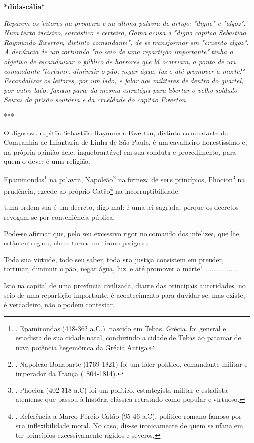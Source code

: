 \textbf{*didascália*}

\emph{Reparem os leitores na primeira e na última palavra do artigo:
"digno" e "algoz". Num texto incisivo, sarcástico e certeiro, Gama acusa
o "digno capitão Sebastião Raymundo Ewerton, distinto comandante", de se
transformar em "cruento algoz". A denúncia de um torturado "no seio de
uma repartição importante" tinha o objetivo de escandalizar o público de
horrores que lá ocorriam, a ponto de um comandante "torturar, diminuir o
pão, negar água, luz e até promover a morte!" Escandalizar os leitores,
por um lado, e falar aos militares de dentro do quartel, por outro lado,
faziam parte da mesma estratégia para libertar o velho soldado Seixas da
prisão solitária e da crueldade do capitão Ewerton. }

***

O digno sr. capitão Sebastião Raymundo Ewerton, distinto comandante da
Companhia de Infantaria de Linha de São Paulo, é um cavalheiro
honestíssimo e, na própria opinião dele, inquebrantável em sua conduta e
procedimento, para quem o dever é uma religião.

Epaminondas\footnote{. Epaminondas (418-362 a.C.), nascido em Tebas,
  Grécia, foi general e estadista de sua cidade natal, conduzindo a
  cidade de Tebas ao patamar de nova potência hegemônica da Grécia
  Antiga.} na palavra, Napoleão\footnote{. Napoleão Bonaparte
  (1769-1821) foi um líder político, comandante militar e imperador da
  França (1804-1814).} na firmeza de seus princípios, Phocion\footnote{.
  Phocion (402-318 a.C) foi um político, estrategista militar e
  estadista ateniense que passou à história clássica retratado como
  popular e virtuoso.} na prudência, excede ao próprio Catão\footnote{.
  Referência a Marco Pórcio Catão (95-46 a.C), político romano famoso
  por sua inflexibilidade moral. No caso, diz-se ironicamente de quem se
  ufana em ter princípios excessivamente rígidos e severos.} na
incorruptibilidade.

Uma ordem sua é um decreto, digo mal: é uma lei sagrada, porque os
decretos revogam-se por conveniência pública.

Pode-se afirmar que, pelo seu excessivo rigor no comando dos infelizes,
que lhe estão entregues, ele se torna um tirano perigoso.

Toda sua virtude, todo seu saber, toda sua justiça consistem em prender,
torturar, diminuir o pão, negar água, luz, e até promover a
morte!....................

Isto na capital de uma província civilizada, diante das principais
autoridades, no seio de uma repartição importante, é acontecimento para
duvidar-se; mas existe, é verdadeiro, não o podem contestar.

